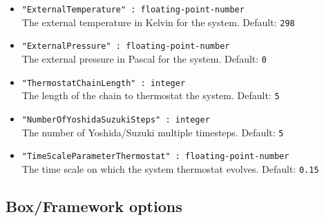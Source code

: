 \begin{itemize}
\item{\verb+"ExternalTemperature" : floating-point-number+}\\
The external temperature in Kelvin for the system. Default: \verb+298+
\item{\verb+"ExternalPressure" : floating-point-number+}\\
The external pressure in Pascal for the system. Default: \verb+0+
\item{\verb+"ThermostatChainLength" : integer+}\\
The length of the chain to thermostat the system. Default: \verb+5+
\item{\verb+"NumberOfYoshidaSuzukiSteps" : integer+}\\
The number of Yoshida/Suzuki multiple timesteps. Default: \verb+5+
\item{\verb+"TimeScaleParameterThermostat" : floating-point-number+}\\
The time scale on which the system thermostat evolves. Default: \verb+0.15+
\end{itemize}

\subsection{Box/Framework options}

